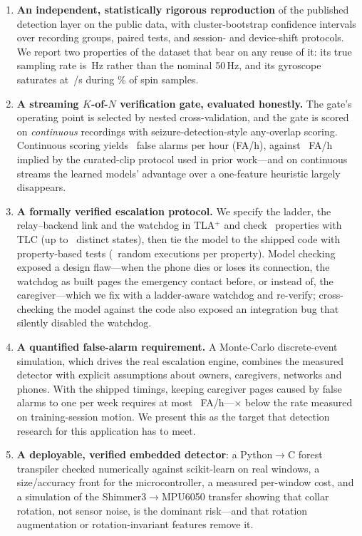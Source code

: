 \begin{enumerate}
\item \textbf{An independent, statistically rigorous reproduction} of the published detection layer on the public data, with cluster-bootstrap confidence intervals over recording groups, paired tests, and session- and device-shift protocols. We report two properties of the dataset that bear on any reuse of it: its true sampling rate is \,Hz rather than the nominal 50\,Hz, and its gyroscope saturates at \,\textdegree{}/s during \% of spin samples.

\item \textbf{A streaming $K$-of-$N$ verification gate, evaluated honestly.} The gate's operating point is selected by nested cross-validation, and the gate is scored on \emph{continuous} recordings with seizure-detection-style any-overlap scoring. Continuous scoring yields ~false alarms per hour (FA/h), against ~FA/h implied by the curated-clip protocol used in prior work---and on continuous streams the learned models' advantage over a one-feature heuristic largely disappears.

\item \textbf{A formally verified escalation protocol.} We specify the ladder, the relay--backend link and the watchdog in TLA$^+$ and check ~properties with TLC (up to ~distinct states), then tie the model to the shipped code with property-based tests (~random executions per property). Model checking exposed a design flaw---when the phone dies or loses its connection, the watchdog as built pages the emergency contact before, or instead of, the caregiver---which we fix with a ladder-aware watchdog and re-verify; cross-checking the model against the code also exposed an integration bug that silently disabled the watchdog.

\item \textbf{A quantified false-alarm requirement.} A Monte-Carlo discrete-event simulation, which drives the real escalation engine, combines the measured detector with explicit assumptions about owners, caregivers, networks and phones. With the shipped timings, keeping caregiver pages caused by false alarms to one per week requires at most ~FA/h---$\times$ below the rate measured on training-session motion. We present this as the target that detection research for this application has to meet.

\item \textbf{A deployable, verified embedded detector}: a Python$\rightarrow$C forest transpiler checked numerically against scikit-learn on real windows, a size/accuracy front for the microcontroller, a measured per-window cost, and a simulation of the Shimmer3$\rightarrow$MPU6050 transfer showing that collar rotation, not sensor noise, is the dominant risk---and that rotation augmentation or rotation-invariant features remove it.
\end{enumerate}

